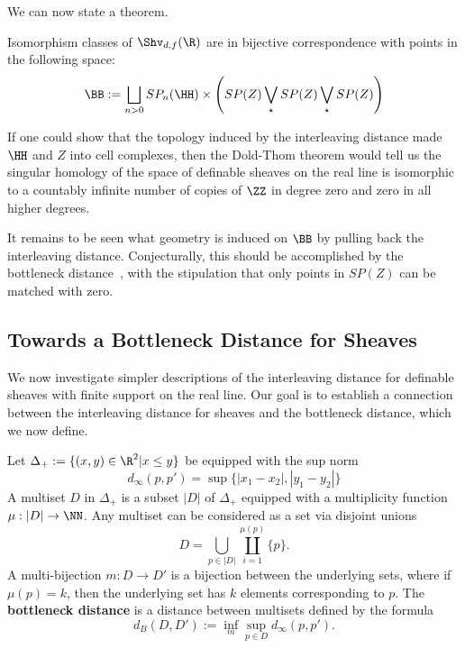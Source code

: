 We can now state a theorem.

\begin{thm}
Isomorphism classes of $\Shv_{d,f}(\R)$ are in bijective correspondence with points in the following space:
\[
\BB:=\bigsqcup_{n>0}SP_n(\HH)\times \left(SP(Z)\bigvee_{\star} SP(Z) \bigvee_{\star} SP(Z)\right)
\]
\end{thm}

\begin{rmk}
If one could show that the topology induced by the interleaving distance made $\HH$ and $Z$ into cell complexes, then the Dold-Thom theorem would tell us the singular homology of the space of definable sheaves on the real line is isomorphic to a countably infinite number of copies of $\ZZ$ in degree zero and zero in all higher degrees.
\end{rmk}

It remains to be seen what geometry is induced on $\BB$ by pulling back the interleaving distance. Conjecturally, this should be accomplished by the bottleneck distance~\cite{chazal2009proximity,bauer2013induced}, with the stipulation that only points in $SP(Z)$ can be matched with zero.

\subsection{Towards a Bottleneck Distance for Sheaves}

We now investigate simpler descriptions of the interleaving distance for definable sheaves with finite support on the real line. Our goal is to establish a connection between the interleaving distance for sheaves and the bottleneck distance, which we now define.

\begin{defn}
Let $\Delta_+:=\{(x,y)\in\R^2| x\leq y\}$ be equipped with the sup norm 
\[
d_{\infty}(p,p')=\sup\{|x_1-x_2|,|y_1-y_2|\}
\]
A multiset $D$ in $\Delta_+$ is a subset $|D|$ of $\Delta_+$ equipped with a multiplicity function $\mu:|D|\to \NN$. Any multiset can be considered as a set via disjoint unions
\[
D=\bigcup_{p\in |D|}\coprod_{i=1}^{\mu(p)}\{p\}.
\]
A multi-bijection $m:D\to D'$ is a bijection between the underlying sets, where if $\mu(p)=k$, then the underlying set has $k$ elements corresponding to $p$. The \textbf{bottleneck distance} is a distance between multisets defined by the formula
\[
d_B(D,D'):=\inf_{m}\sup_{p\in D} d_{\infty}(p,p').
\]
\end{defn}

